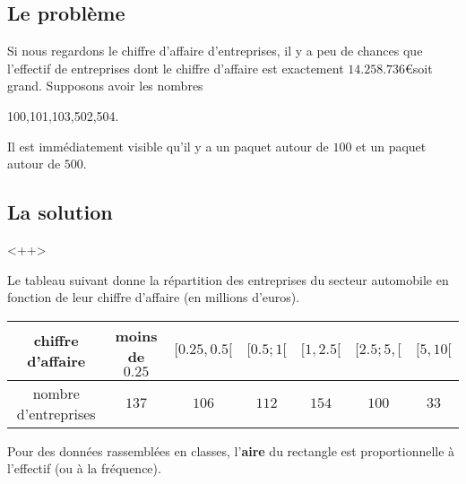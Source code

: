 \subsection{Le problème}

Si nous regardons le chiffre d'affaire d'entreprises, il y a peu de chances que l'effectif de entreprises dont le chiffre d'affaire est exactement \( 14.258.736\)\euro soit grand. Supposons avoir les nombres
\begin{center}
    100,101,103,502,504.
\end{center}
Il est immédiatement visible qu'il y a un paquet autour de \( 100\) et un paquet autour de \( 500\).

\subsection{La solution}

<++>

Le tableau suivant donne la répartition des entreprises du secteur automobile en fonction de leur chiffre d'affaire (en millions d'euros).

\begin{center}
    \begin{tabular}{|c||c|c|c|c|c|c|}
        \hline
        chiffre d'affaire&moins de \( 0.25\)&\( \mathopen[ 0.25 ,0.5 [\)&$\mathopen[ 0.5;1  [$&$\mathopen[ 1 , 2.5 [$&$\mathopen[ 2.5;5 ,  [$&$\mathopen[ 5 , 10 [$\\
            \hline\hline
            nombre d'entreprises&\( 137\)&\( 106\)&\( 112\)&$154$&\( 100\)&\( 33\)\\
            \hline
    \end{tabular}
\end{center}

\begin{Aretenir}
Pour des données rassemblées en classes, l'\textbf{aire} du rectangle est proportionnelle à l'effectif (ou à la fréquence). 
\end{Aretenir}

